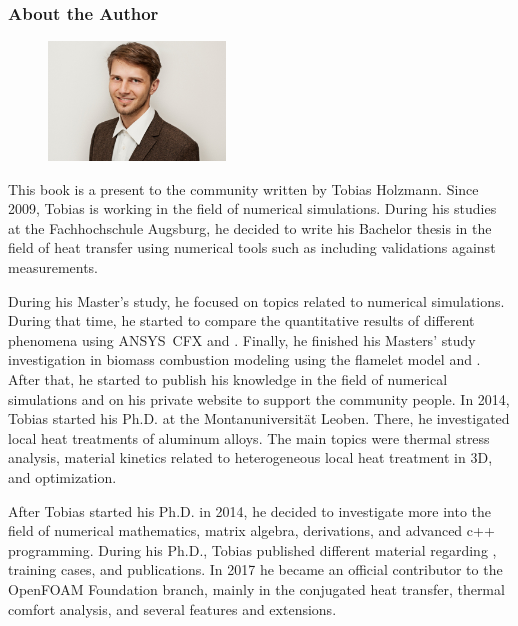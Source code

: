 
\newpage
\pagestyle{empty}

\subsubsection{About the Author}


\begin{figure}
\vspace{-35px}
\begin{center}
 \includegraphics[width=0.42\textwidth]{Cover/TobiasHolzmann.jpg}
\end{center}
\vspace{-30px}
\end{figure}
This book is a present to the \OF community written by Tobias Holzmann.
Since 2009, Tobias is working in the field of numerical simulations. During his
studies at the Fachhochschule Augsburg, he decided to write his Bachelor thesis
in the field of heat transfer using numerical tools such as \OF including
validations against measurements.

During his Master's study, he focused on topics related to numerical simulations.
During that time, he started to compare the quantitative results of different
phenomena using ANSYS\textregistered~CFX and \OF. Finally, he finished his
Masters' study investigation in biomass combustion modeling using the flamelet
model and \OF. After that, he started to publish his knowledge in the field of
numerical simulations and \OF on his private website to support the \OF
community people. In 2014, Tobias started his Ph.D. at
the Montanuniversität Leoben. There, he investigated local heat treatments
of aluminum alloys. The main topics were thermal stress analysis, material
kinetics related to heterogeneous local heat treatment in 3D, and optimization.

After Tobias started his Ph.D. in 2014, he decided to investigate more into the
field of numerical mathematics, matrix algebra, derivations, and advanced
c++ programming. During his Ph.D., Tobias published different material regarding
\OF, training cases, and publications. In 2017 he became an
official contributor to the OpenFOAM Foundation branch, mainly in the
conjugated heat transfer, thermal comfort analysis, and several features and
extensions.

